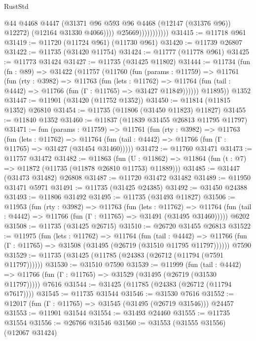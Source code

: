 \begin{lexlean}{RustStd}
\begin{coremodule}
                                @44
                                @4468
                                @4447
                                (@31371 @96 @593 @96 @4468 (@12147 (@31376 @96)) @12272)
                                (@12164 @31330 @4066))))
                          @25669)))))))))))
@31415 := @11718 @961
@31419 := @11720 (@11724 @961) (@11730 @961)
@31420 := @11739 @26807
@31422 := @11735 (@31420 @11754)
@31424 := @11777 (@11778 @961)
@31425 := @11773 @31424
@31427 := @11735 (@31425 @11802)
@31444 := @11734
    (fun (fn : @89) =>
    @31422
      (@11757
        (@11760
          (fun (params : @11759) =>
          @11761
            (fun (rty : @3982) =>
            @11763
              (fun (lets : @11762) =>
              @11764 (fun (tail : @4442) => @11766 (fun (Γ : @11765) => @31427 @11849))))))
        @11895))
    @1352
@31447 := @11901 (@31420 (@11752 @1352))
@31450 := @11814 (@11815 @1352) @26810
@31454 := @11735 (@11806 (@31450 @11823) @11827)
@31455 := @11840 @1352
@31460 := @11837 (@11839 @31455 @26813 @11795 @11797)
@31471 := fun (params : @11759) =>
  @11761
    (fun (rty : @3982) =>
    @11763
      (fun (lets : @11762) =>
      @11764 (fun (tail : @4442) => @11766 (fun (Γ : @11765) => @31427 (@31454 @31460)))))
@31472 := @11760 @31471
@31473 := @11757 @31472
@31482 := @11863
    (fun (U : @11862) => @11864 (fun (t : @7) => @11872 (@11735 (@11878 @26810 @11753) @11889)))
@31485 := @31447 (@31473 @31482) @26808
@31487 := @11720 @31472 @31482
@31489 := @11950 @31471 @5971
@31491 := @11735 (@31425 @24385)
@31492 := @31450 @24388
@31493 := @11806 @31492
@31495 := @11735 (@31493 @11827)
@31506 := @11953
    (fun (rty : @3982) =>
    @11763
      (fun (lets : @11762) =>
      @11764 (fun (tail : @4442) => @11766 (fun (Γ : @11765) => @31491 (@31495 @31460)))))
    @6202
@31508 := @11735 (@31425 @26715)
@31510 := @26720 @31455 @26813
@31522 := @11975
    (fun (lets : @11762) =>
    @11764
      (fun (tail : @4442) =>
      @11766 (fun (Γ : @11765) => @31508 (@31495 (@26719 (@31510 @11795 @11797))))))
    @7590
@31529 := @11735 (@31425 (@11785 (@24383 (@26712 (@11794 (@7591 @11797))))))
@31530 := @31510 @7590
@31539 := @11999
    (fun (tail : @4442) => @11766 (fun (Γ : @11765) => @31529 (@31495 (@26719 (@31530 @11797)))))
    @7616
@31544 := @31425 (@11785 (@24383 (@26712 (@11794 @7617))))
@31545 := @11735 @31544
@31546 := @31530 @7616
@31552 := @12017 (fun (Γ : @11765) => @31545 (@31495 (@26719 @31546))) @24457
@31553 := @11901 @31544
@31554 := @31493 @24460
@31555 := @11735 @31554
@31556 := @26766 @31546
@31560 := @31553 (@31555 @31556) (@12067 @31424)

\end{coremodule}
\end{lexlean}
